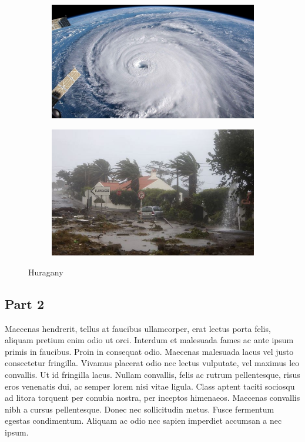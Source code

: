 \documentclass[a4paper, 12pt]{article}
\begin{document}
\begin{figure}[!t]
	\centering
	\begin{subfigure}[b]{0.45\textwidth}
		\centering
		\includegraphics[width=\textwidth]{huragan.jpg}
		\caption{}
		\label{fig:img-1}
	\end{subfigure}
	\hfill
	\begin{subfigure}[b]{0.45\textwidth}
		\centering
		\includegraphics[width=\textwidth]{huragan2.jpg}
		\caption{}
		\label{fig:img-1}
	\end{subfigure}
	\caption{Huragany}
	\label{fig:two-figs}
\end{figure}
\subsection{Part 2}
Maecenas hendrerit, tellus at faucibus ullamcorper, erat lectus porta felis, aliquam pretium enim odio ut orci. Interdum et malesuada fames ac ante ipsum primis in faucibus. Proin in consequat odio. Maecenas malesuada lacus vel justo consectetur fringilla. Vivamus placerat odio nec lectus vulputate, vel maximus leo convallis. Ut id fringilla lacus. Nullam convallis, felis ac rutrum pellentesque, risus eros venenatis dui, ac semper lorem nisi vitae ligula. Class aptent taciti sociosqu ad litora torquent per conubia nostra, per inceptos himenaeos. Maecenas convallis nibh a cursus pellentesque. Donec nec sollicitudin metus. Fusce fermentum egestas condimentum. Aliquam ac odio nec sapien imperdiet accumsan a nec ipsum.
\end{document}

